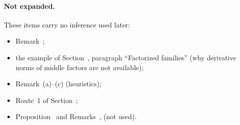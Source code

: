 \paragraph{Not expanded.} These items carry no inference used later:
\begin{itemize}
\item Remark~;
\item the example of Section~, paragraph ``Factorized families'' (why derivative norms of middle factors are not available);
\item Remark~(a)--(c) (heuristics);
\item Route~1 of Section~;
\item Proposition~ and Remarks~,  (not used).
\end{itemize}

